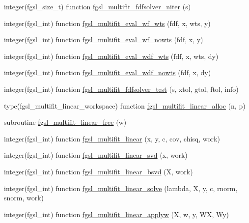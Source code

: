 \begin{DoxyCompactItemize}
\item 
integer(fgsl\+\_\+size\+\_\+t) function \hyperlink{multifit_8finc_a95e5419a5ed6ea33a07d5ccf4773db66}{fgsl\+\_\+multifit\+\_\+fdfsolver\+\_\+niter} (s)
\item 
integer(fgsl\+\_\+int) function \hyperlink{multifit_8finc_aca9f3f0ff935c55c8acb48e6050d9f40}{fgsl\+\_\+multifit\+\_\+eval\+\_\+wf\+\_\+wts} (fdf, x, wts, y)
\item 
integer(fgsl\+\_\+int) function \hyperlink{multifit_8finc_abba36b94e60967084c4e875d900f7eb3}{fgsl\+\_\+multifit\+\_\+eval\+\_\+wf\+\_\+nowts} (fdf, x, y)
\item 
integer(fgsl\+\_\+int) function \hyperlink{multifit_8finc_af51a96ec290664c09af0f61e373974c5}{fgsl\+\_\+multifit\+\_\+eval\+\_\+wdf\+\_\+wts} (fdf, x, wts, dy)
\item 
integer(fgsl\+\_\+int) function \hyperlink{multifit_8finc_a2c3d0fb5be9b2cc8973575acbabeb5e9}{fgsl\+\_\+multifit\+\_\+eval\+\_\+wdf\+\_\+nowts} (fdf, x, dy)
\item 
integer(fgsl\+\_\+int) function \hyperlink{multifit_8finc_abe506e9865a7c63b43603fac007b20c8}{fgsl\+\_\+multifit\+\_\+fdfsolver\+\_\+test} (s, xtol, gtol, ftol, info)
\item 
type(fgsl\+\_\+multifit\+\_\+linear\+\_\+workspace) function \hyperlink{multifit_8finc_a2003bf67371be173ab6c188a9fb10c4e}{fgsl\+\_\+multifit\+\_\+linear\+\_\+alloc} (n, p)
\item 
subroutine \hyperlink{multifit_8finc_a8a573d86c614625296daddac17b8608e}{fgsl\+\_\+multifit\+\_\+linear\+\_\+free} (w)
\item 
integer(fgsl\+\_\+int) function \hyperlink{multifit_8finc_afceca2124515ca5de8c5d5a7e9e00e3f}{fgsl\+\_\+multifit\+\_\+linear} (x, y, c, cov, chisq, work)
\item 
integer(fgsl\+\_\+int) function \hyperlink{multifit_8finc_a5f4796c1d063eab7640e12010930e940}{fgsl\+\_\+multifit\+\_\+linear\+\_\+svd} (x, work)
\item 
integer(fgsl\+\_\+int) function \hyperlink{multifit_8finc_abc1863ac8626859dee6a3da124ec1c1b}{fgsl\+\_\+multifit\+\_\+linear\+\_\+bsvd} (X, work)
\item 
integer(fgsl\+\_\+int) function \hyperlink{multifit_8finc_a18c93fb937a92dc25e1f082f286831e9}{fgsl\+\_\+multifit\+\_\+linear\+\_\+solve} (lambda, X, y, c, rnorm, snorm, work)
\item 
integer(fgsl\+\_\+int) function \hyperlink{multifit_8finc_af716b5bd5a3c054cdc966cf0a959a995}{fgsl\+\_\+multifit\+\_\+linear\+\_\+applyw} (X, w, y, W\+X, Wy)

\end{DoxyCompactItemize}
